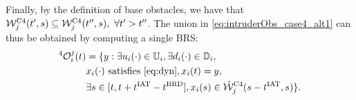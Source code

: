 Finally, by the definition of base obstacles, we have that $\mathcal{W}_j^{\text{C4}}(t', s) \subseteq \mathcal{W}_j^{\text{C4}}(t'', s), ~\forall t' > t''$. The union in \eqref{eq:intruderObs_case4_alt1} can thus be obtained by computing a single BRS:
\begin{equation} \label{eq:intruderObs_case4} 
\begin{aligned}
^4\ioset_i^j(t) & = \{y: \exists \ctrl_i(\cdot) \in \cfset_i, \exists \dstb_i(\cdot) \in \dfset_i, \\
& \state_i(\cdot) \text{ satisfies \eqref{eq:dyn}}, \state_i(t) = y, \\
& \exists s \in [t, t + \iat - \brd], \state_i(s) \in \tilde{\frs}_j^{\text{C4}}(s-\iat, s)\}.
\end{aligned}
\end{equation}

